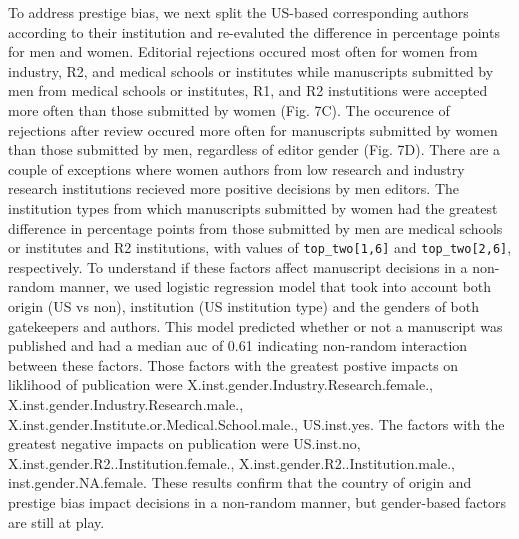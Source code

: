 \documentclass[11pt,]{article}
\begin{document}
To address prestige bias, we next split the US-based corresponding
authors according to their institution and re-evaluted the difference in
percentage points for men and women. Editorial rejections occured most
often for women from industry, R2, and medical schools or institutes
while manuscripts submitted by men from medical schools or institutes,
R1, and R2 instutitions were accepted more often than those submitted by
women (Fig. 7C). The occurence of rejections after review occured more
often for manuscripts submitted by women than those submitted by men,
regardless of editor gender (Fig. 7D). There are a couple of exceptions
where women authors from low research and industry research institutions
recieved more positive decisions by men editors. The institution types
from which manuscripts submitted by women had the greatest difference in
percentage points from those submitted by men are medical schools or
institutes and R2 institutions, with values of
\texttt{top\_two{[}1,6{]}} and \texttt{top\_two{[}2,6{]}}, respectively.
To understand if these factors affect manuscript decisions in a
non-random manner, we used logistic regression model that took into
account both origin (US vs non), institution (US institution type) and
the genders of both gatekeepers and authors. This model predicted
whether or not a manuscript was published and had a median auc of 0.61
indicating non-random interaction between these factors. Those factors
with the greatest postive impacts on liklihood of publication were
X.inst.gender.Industry.Research.female.,
X.inst.gender.Industry.Research.male.,
X.inst.gender.Institute.or.Medical.School.male., US.inst.yes. The
factors with the greatest negative impacts on publication were
US.inst.no, X.inst.gender.R2..Institution.female.,
X.inst.gender.R2..Institution.male., inst.gender.NA.female. These
results confirm that the country of origin and prestige bias impact
decisions in a non-random manner, but gender-based factors are still at
play.
\end{document}
